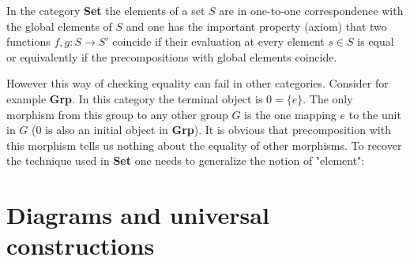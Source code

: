 	\begin{remark}
		In the category \textbf{Set} the elements of a set $S$ are in one-to-one correspondence with the global elements of $S$ and one has the important property (axiom) that two functions $f, g:S\rightarrow S'$ coincide if their evaluation at every element $s\in S$ is equal or equivalently if the precompositions with global elements coincide.
		
		However this way of checking equality can fail in other categories. Consider for example \textbf{Grp}. In this category the terminal object is $0 = \{e\}$. The only morphism from this group to any other group $G$ is the one mapping $e$ to the unit in $G$ ($0$ is also an initial object in \textbf{Grp}). It is obvious that precomposition with this morphism tells us nothing about the equality of other morphisms. To recover the technique used in \textbf{Set} one needs to generalize the notion of "element":
	\end{remark}

\section{Diagrams and universal constructions}

	
